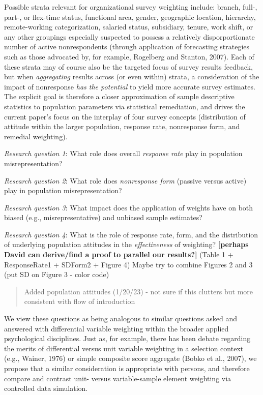 \documentclass[
  man,mask]{apa7}
\begin{document}
Possible strata relevant for organizational survey weighting include: branch, full-, part-, or flex-time status, functional area, gender, geographic location, hierarchy, remote-working categorization, salaried status, subsidiary, tenure, work shift, or any other groupings especially suspected to possess a relatively disporportionate number of active nonrespondents (through application of forecasting strategies such as those advocated by, for example, Rogelberg and Stanton, 2007). Each of these strata may of course also be the targeted focus of survey results feedback, but when \emph{aggregating} results across (or even within) strata, a consideration of the impact of nonresponse \emph{has the potential} to yield more accurate survey estimates. The explicit goal is therefore a closer approximation of sample descriptive statistics to population parameters via statistical remediation, and drives the current paper's focus on the interplay of four survey concepts (distribution of attitude within the larger population, response rate, nonresponse form, and remedial weighting).

\emph{Research question 1}: What role does overall \emph{response rate} play in population misrepresentation?

\emph{Research question 2}: What role does \emph{nonresponse form} (passive versus active) play in population misrepresentation?

\emph{Research question 3}: What impact does the application of weights have on both biased (e.g., misrepresentative) and unbiased sample estimates?

\emph{Research question 4}: What is the role of response rate, form, and the distribution of underlying population attitudes in the \emph{effectiveness} of weighting? \textbf{{[}perhaps David can derive/find a proof to parallel our results?{]}} (Table 1 + ResponseRate1 + SDForm2 + Figure 4)
Maybe try to combine Figures 2 and 3 (put SD on Figure 3 - color code)

\begin{quote}
Added population attitudes (1/20/23) - not sure if this clutters but more consistent with flow of introduction
\end{quote}

We view these questions as being analogous to similar questions asked and answered with differential variable weighting within the broader applied psychological disciplines. Just as, for example, there has been debate regarding the merits of differential versus unit variable weighting in a selection context (e.g., Wainer, 1976) or simple composite score aggregate (Bobko et al., 2007), we propose that a similar consideration is appropriate with persons, and therefore compare and contrast unit- versus variable-sample element weighting via controlled data simulation.
\end{document}
